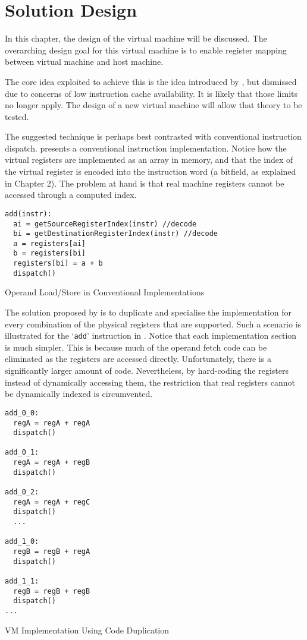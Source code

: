 \chapter{Solution Design}
	In this chapter, the design of the virtual machine will be discussed. The overarching design goal for this virtual machine is to enable register mapping between virtual machine and host machine.
	
	The core idea exploited to achieve this is the idea introduced by \cite{stackcaching}, but dismissed due to concerns of low instruction cache availability. It is likely that those limits no longer apply. The design of a new virtual machine will allow that theory to be tested.
	
	The suggested technique is perhaps best contrasted with conventional instruction dispatch.  presents a conventional instruction implementation. Notice how the virtual registers are implemented as an array in memory, and that the index of the virtual register is encoded into the instruction word (a bitfield, as explained in Chapter 2). The problem at hand is that real machine registers cannot be accessed through a computed index.
	
	\begin{myfigure}
		\begin{lstlisting}
add(instr):
  ai = getSourceRegisterIndex(instr) //decode
  bi = getDestinationRegisterIndex(instr) //decode
  a = registers[ai]
  b = registers[bi]
  registers[bi] = a + b
  dispatch()
		\end{lstlisting}
		\caption{Operand Load/Store in Conventional Implementations}
		\label{fig:operandfetch}
	\end{myfigure}
	
	The solution proposed by \cite{stackcaching} is to duplicate and specialise the implementation for every combination of the physical registers that are supported. Such a scenario is illustrated for the `\texttt{add}' instruction in . Notice that each implementation section is much simpler. This is because much of the operand fetch code can be eliminated as the registers are accessed directly. Unfortunately, there is a significantly larger amount of code. Nevertheless, by hard-coding the registers instead of dynamically accessing them, the restriction that real registers cannot be dynamically indexed is circumvented.
	
	\begin{myfigure}
		\begin{lstlisting}
add_0_0:
  regA = regA + regA
  dispatch()

add_0_1:
  regA = regA + regB
  dispatch()

add_0_2:
  regA = regA + regC
  dispatch()
  ...

add_1_0:
  regB = regB + regA
  dispatch()

add_1_1:
  regB = regB + regB
  dispatch()
...		
		\end{lstlisting}
		\caption{VM Implementation Using Code Duplication}
		\label{fig:dupimplementation}
	\end{myfigure}
	
